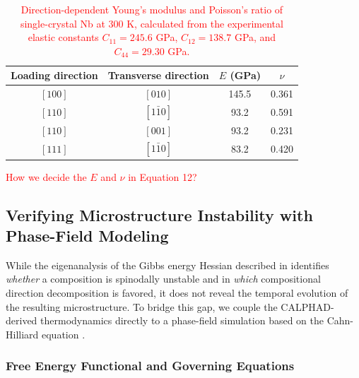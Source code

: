 \begin{table}[htbp]
\centering
\color{red}
\caption{\textcolor{red}{Direction-dependent Young's modulus and Poisson's ratio of single-crystal Nb at 300 K, calculated from the experimental elastic constants
$C_{11}=245.6$ GPa, $C_{12}=138.7$ GPa, and $C_{44}=29.30$ GPa.}}
\label{tab:nb_directional_elasticity}
\begin{tabular}{cccc}
\hline
Loading direction & Transverse direction & $E$ (GPa) & $\nu$ \\
\hline
$[100]$ & $[010]$ & 145.5 & 0.361 \\
$[110]$ & $[1\bar{1}0]$ & 93.2 & 0.591 \\
$[110]$ & $[001]$ & 93.2 & 0.231 \\
$[111]$ & $[1\bar{1}0]$ & 83.2 & 0.420 \\
\hline
\end{tabular}
\end{table}
\textcolor{red}{How we decide the $E$ and $\nu$ in Equation 12?}

\subsection{Verifying Microstructure Instability with Phase-Field Modeling}
\label{sec:pf_theory}

While the eigenanalysis of the Gibbs energy Hessian described in
 identifies \emph{whether} a composition is
spinodally unstable and in \emph{which} compositional direction
decomposition is favored, it does not reveal the temporal evolution
of the resulting microstructure.  To bridge this gap, we couple the
CALPHAD-derived thermodynamics directly to a phase-field simulation
based on the Cahn-Hilliard equation \cite{cahn1961spinodal,cahn1958free}.

\subsubsection{Free Energy Functional and Governing Equations}

